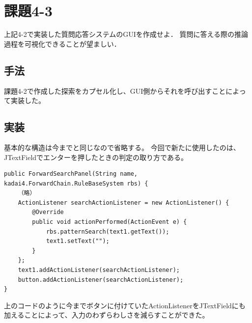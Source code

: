 \documentclass{jarticle}
\begin{document}
\section{課題4-3}
\begin{screen}
 上記4-2で実装した質問応答システムのGUIを作成せよ．
 質問に答える際の推論過程を可視化できることが望ましい．
\end{screen}

\subsection{手法}
課題4-2で作成した探索をカプセル化し、GUI側からそれを呼び出すことによって実装した。

\subsection{実装}
基本的な構造は今までと同じなので省略する。
今回で新たに使用したのは、JTextFieldでエンターを押したときの判定の取り方である。

\begin{lstlisting}[caption=JTextFieldのActionListener,label=src:text]
public ForwardSearchPanel(String name, kadai4.ForwardChain.RuleBaseSystem rbs) {
	（略）
	ActionListener searchActionListener = new ActionListener() {
		@Override
		public void actionPerformed(ActionEvent e) {
			rbs.patternSearch(text1.getText());
			text1.setText("");
		}
	};
	text1.addActionListener(searchActionListener);
	button.addActionListener(searchActionListener);
}
\end{lstlisting}
上のコードのように今までボタンに付けていたActionListenerをJTextFieldにも加えることによって、入力のわずらわしさを減らすことができた。
\end{document}
